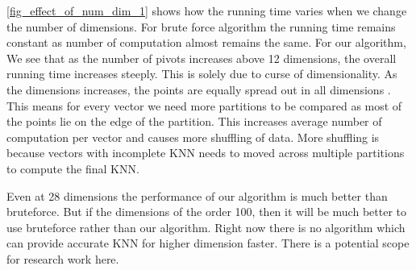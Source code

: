 \cref{fig_effect_of_num_dim_1} shows how
the running time varies when we change the number of dimensions.
For brute force algorithm the
running time remains constant as number of computation almost remains the
same. For our algorithm, We see that as the number of pivots increases above 12 dimensions, the
overall running time increases steeply. This is solely due to curse of
dimensionality. As the dimensions increases, the points are equally
spread out in all dimensions \cite{beyer_when_1999}. This means for every vector we need more
partitions to be compared as most of the points lie on the edge of the
partition. This increases average number of computation per vector and
causes more shuffling of data. More shuffling is because vectors with
incomplete KNN needs to moved across multiple partitions to compute
the final KNN.

Even at 28 dimensions the
performance of our algorithm is much better than bruteforce. But if
the dimensions of the order 100, then it will be much better to use
bruteforce rather than our algorithm. Right now there is no algorithm
which can provide accurate KNN for higher dimension faster. There is a
potential scope for research work here.

